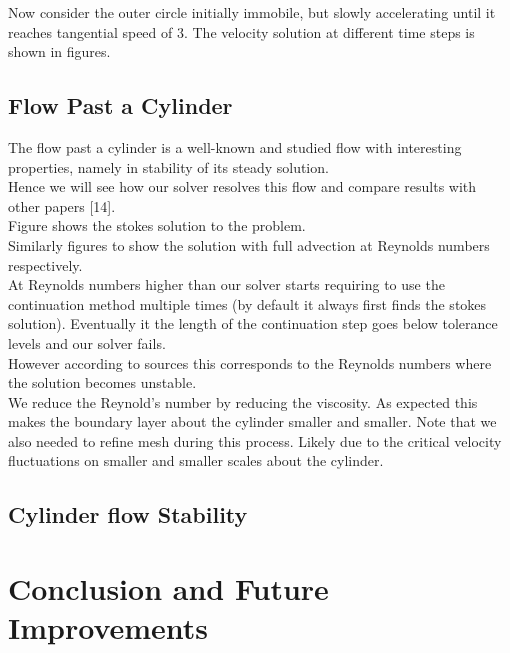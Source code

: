 \documentclass[11pt,twoside,a4paper]{article}
\begin{document}
Now consider the outer circle initially immobile, but slowly accelerating until it reaches tangential speed of $3$. The velocity solution at different time steps is shown in figures.

\subsection{Flow Past a Cylinder}

The flow past a cylinder is a well-known and studied flow with interesting properties, namely in stability of its steady solution.\\
Hence we will see how our solver resolves this flow and compare results with other papers [14].\\

Figure shows the stokes solution to the problem.\\
Similarly figures to show the solution with full advection at Reynolds numbers respectively.\\
At Reynolds numbers higher than our solver starts requiring to use the continuation method multiple times (by default it always first finds the stokes solution). Eventually it the length of the continuation step goes below tolerance levels and our solver fails.\\
However according to sources this corresponds to the Reynolds numbers where the solution becomes unstable.\\
We reduce the Reynold's number by reducing the viscosity. As expected this makes the boundary layer about the cylinder smaller and smaller. Note that we also needed to refine mesh during this process. Likely due to the critical velocity fluctuations on smaller and smaller scales about the cylinder.

\subsection{Cylinder flow Stability}

\section{Conclusion and Future Improvements}
\end{document}
